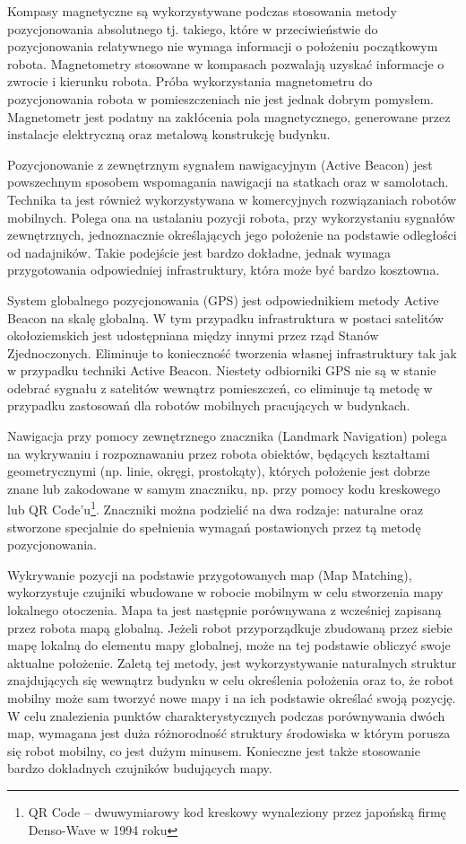Kompasy magnetyczne są wykorzystywane podczas stosowania metody pozycjonowania
absolutnego tj. takiego, które w przeciwieństwie do pozycjonowania relatywnego
nie wymaga informacji o położeniu początkowym robota. Magnetometry stosowane w
kompasach pozwalają uzyskać informacje o zwrocie i kierunku robota. Próba
wykorzystania magnetometru do pozycjonowania robota w pomieszczeniach nie jest
jednak dobrym pomysłem. Magnetometr jest podatny na zakłócenia pola
magnetycznego, generowane przez instalacje elektryczną oraz metalową konstrukcję
budynku.

Pozycjonowanie z zewnętrznym sygnałem nawigacyjnym (Active Beacon) jest
powszechnym sposobem wspomagania nawigacji na statkach oraz w samolotach.
Technika ta jest również wykorzystywana w komercyjnych rozwiązaniach robotów
mobilnych. Polega ona na ustalaniu pozycji robota, przy wykorzystaniu sygnałów
zewnętrznych, jednoznacznie określających jego położenie na podstawie odległości
od nadajników. Takie podejście jest bardzo dokładne, jednak wymaga przygotowania
odpowiedniej infrastruktury, która może być bardzo kosztowna.

System globalnego pozycjonowania (GPS) jest odpowiednikiem metody Active Beacon
na skalę globalną. W tym przypadku infrastruktura w postaci satelitów
okołoziemskich jest udostępniana między innymi przez rząd Stanów Zjednoczonych.
Eliminuje to konieczność tworzenia własnej infrastruktury tak jak w przypadku
techniki Active Beacon. Niestety odbiorniki GPS nie są w stanie odebrać sygnału z
satelitów wewnątrz pomieszczeń, co eliminuje tą metodę w przypadku zastosowań dla
robotów mobilnych pracujących w budynkach.

Nawigacja przy pomocy zewnętrznego znacznika (Landmark Navigation) polega na
wykrywaniu i rozpoznawaniu przez robota obiektów, będących kształtami
geometrycznymi (np. linie, okręgi, prostokąty), których położenie jest dobrze
znane lub zakodowane w samym znaczniku, np. przy pomocy kodu kreskowego lub QR
Code'u\footnote{QR Code -- dwuwymiarowy kod kreskowy wynaleziony przez japońską
firmę Denso-Wave w 1994 roku}. Znaczniki można podzielić na dwa rodzaje:
naturalne oraz stworzone specjalnie do spełnienia wymagań postawionych przez tą
metodę pozycjonowania.

Wykrywanie pozycji na podstawie przygotowanych map (Map Matching), wykorzystuje
czujniki wbudowane w robocie mobilnym w celu stworzenia mapy lokalnego otoczenia.
Mapa ta jest następnie porównywana z wcześniej zapisaną przez robota mapą
globalną. Jeżeli robot przyporządkuje zbudowaną przez siebie mapę lokalną do
elementu mapy globalnej, może na tej podstawie obliczyć swoje aktualne położenie.
Zaletą tej metody, jest wykorzystywanie naturalnych struktur znajdujących się
wewnątrz budynku w celu określenia położenia oraz to, że robot mobilny może sam
tworzyć nowe mapy i na ich podstawie określać swoją pozycję. W celu znalezienia
punktów charakterystycznych podczas porównywania dwóch map, wymagana jest duża
różnorodność struktury środowiska w którym porusza się robot mobilny, co jest
dużym minusem. Konieczne jest także stosowanie bardzo dokładnych czujników
budujących mapy.

